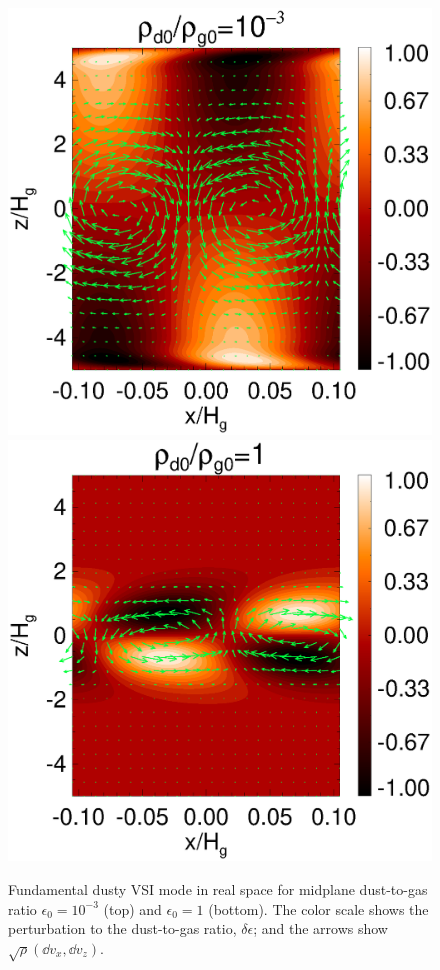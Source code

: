 \begin{figure}
\includegraphics[scale=0.33, clip=true, trim=0.5cm 0cm 3cm 0cm]{figures/result2d_dg1d-3.ps}\includegraphics[scale=0.33, clip=true, trim=2cm 0cm 0cm 0cm]{figures/result2d_dg1.ps}
  \caption{Fundamental dusty VSI mode in real space for midplane dust-to-gas
    ratio $\epsilon_0=10^{-3}$ (top) and $\epsilon_0=1$
    (bottom). The color scale shows the perturbation to the
    dust-to-gas ratio, $\delta\epsilon$; and the arrows show
    $\sqrt{\rho}\left(\dd v_x, \dd v_z\right)$. 
    \label{vsi_dust_loading2d}
    }
\end{figure}







